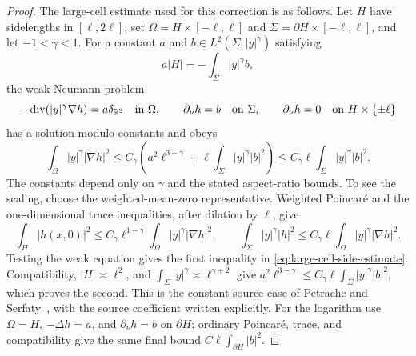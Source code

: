 \begin{proof}
The large-cell estimate used for this correction is as follows.
Let $H$ have sidelengths in $[\ell,2\ell]$, set
$\Omega=H\times[-\ell,\ell]$ and
$\Sigma=\partial H\times[-\ell,\ell]$, and let $-1<\gamma<1$.
For a constant $a$ and $b\in L^2(\Sigma,|y|^\gamma)$ satisfying
\[
              a|H|=-\int_\Sigma |y|^\gamma b,
\]
the weak Neumann problem
\[
 -\operatorname{div}(|y|^\gamma\nabla h)
                  =a\delta_{\mathbb R^2}\quad\hbox{in }\Omega,
 \qquad \partial_\nu h=b\quad\hbox{on }\Sigma,
 \qquad \partial_\nu h=0\quad\hbox{on }H\times\{\pm\ell\}
\]
has a solution modulo constants and obeys
\begin{equation}
 \int_\Omega |y|^\gamma|\nabla h|^2
 \le C_\gamma\left(a^2\ell^{3-\gamma}
              +\ell\int_\Sigma |y|^\gamma|b|^2\right)
 \le C_\gamma\ell\int_\Sigma |y|^\gamma|b|^2.
 \label{eq:large-cell-side-estimate}
\end{equation}
The constants depend only on $\gamma$ and the stated aspect-ratio
bounds.  To see the scaling, choose the weighted-mean-zero
representative.  Weighted Poincar\'e and the one-dimensional trace
inequalities, after dilation by $\ell$, give
\[
 \int_H|h(x,0)|^2\le C_\gamma\ell^{1-\gamma}
                              \int_\Omega |y|^\gamma|\nabla h|^2,
 \qquad
 \int_\Sigma |y|^\gamma|h|^2
          \le C_\gamma\ell\int_\Omega |y|^\gamma|\nabla h|^2.
\]
Testing the weak equation gives the first inequality in
\eqref{eq:large-cell-side-estimate}.
Compatibility, $|H|\asymp\ell^2$, and
$\int_\Sigma|y|^\gamma\asymp\ell^{\gamma+2}$ give
$a^2\ell^{3-\gamma}\le C_\gamma\ell\int_\Sigma|y|^\gamma|b|^2$,
which proves the second.  This is the constant-source case of
Petrache and Serfaty~\citep[Lemma~6.4]{PetracheSerfaty2017}, with the source coefficient
written explicitly.  For the logarithm use $\Omega=H$,
$-\Delta h=a$, and $\partial_\nu h=b$ on $\partial H$;
ordinary Poincar\'e, trace, and compatibility give the same final
bound $C\ell\int_{\partial H}|b|^2$.


\end{proof}
